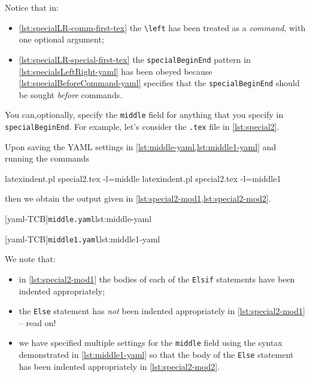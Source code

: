 	Notice that in:
	\begin{itemize}
		\item \cref{lst:specialLR-comm-first-tex} the \lstinline!\left! has been treated as a
		      \emph{command}, with one optional argument;
		\item \cref{lst:specialLR-special-first-tex} the \texttt{specialBeginEnd} pattern in \cref{lst:specialsLeftRight-yaml}
		      has been obeyed because \cref{lst:specialBeforeCommand-yaml} specifies that the
		      \texttt{specialBeginEnd} should be sought \emph{before} commands.
	\end{itemize}

	You can,optionally, specify%
	 the
	\texttt{middle} field for anything that you specify in \texttt{specialBeginEnd}.
	For example, let's consider the \texttt{.tex} file in \cref{lst:special2}.


	Upon saving the YAML settings in \cref{lst:middle-yaml,lst:middle1-yaml} and running the commands
	\begin{commandshell}
latexindent.pl special2.tex -l=middle
latexindent.pl special2.tex -l=middle1
    \end{commandshell}
	then we obtain the output given in \cref{lst:special2-mod1,lst:special2-mod2}.

        \begin{cmhtcbraster}
		[yaml-TCB]{\texttt{middle.yaml}}{lst:middle-yaml}
        \end{cmhtcbraster}

        \begin{cmhtcbraster}
		[yaml-TCB]{\texttt{middle1.yaml}}{lst:middle1-yaml}
        \end{cmhtcbraster}

	We note that:
	\begin{itemize}
		\item in \cref{lst:special2-mod1} the bodies of each of the \texttt{Elsif} statements
		      have been indented appropriately;
		\item the \texttt{Else} statement has \emph{not} been indented
		      appropriately in \cref{lst:special2-mod1} -- read on!
		\item we have specified multiple settings for the \texttt{middle} field using the
		      syntax demonstrated in \cref{lst:middle1-yaml} so that the body of the
		      \texttt{Else} statement has been indented appropriately in
		      \cref{lst:special2-mod2}.
	\end{itemize}

